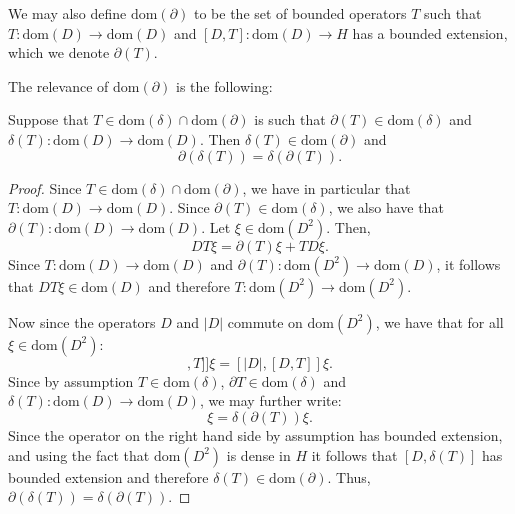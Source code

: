     We may also define $\mathrm{dom}(\partial)$ to be the set of bounded operators $T$ such that $T:\mathrm{dom}(D)\to \mathrm{dom}(D)$
    and $[D,T]:\mathrm{dom}(D)\to H$ has a bounded extension, which we denote $\partial(T)$. 
    
    The relevance of $\mathrm{dom}(\partial)$ is the following:
    \begin{lem}\label{delta and partial commute}
        Suppose that $T \in \mathrm{dom}(\delta)\cap\mathrm{dom}(\partial)$ is such that $\partial(T) \in \mathrm{dom}(\delta)$ and $\delta(T):\mathrm{dom}(D)\to \mathrm{dom}(D)$. Then $\delta(T) \in \mathrm{dom}(\partial)$ and
        \begin{equation*}
            \partial(\delta(T)) = \delta(\partial(T)).
        \end{equation*}
    \end{lem}
    \begin{proof}
        Since $T \in \mathrm{dom}(\delta)\cap\mathrm{dom}(\partial)$, we have in particular that $T:\mathrm{dom}(D)\to\mathrm{dom}(D)$. Since $\partial(T) \in \mathrm{dom}(\delta)$,
        we also have that $\partial(T):\mathrm{dom}(D)\to \mathrm{dom}(D)$. Let $\xi \in \mathrm{dom}(D^2)$. Then,
        \begin{equation*}
            DT\xi = \partial(T)\xi + TD\xi.
        \end{equation*}
        Since $T:\mathrm{dom}(D)\to \mathrm{dom}(D)$ and $\partial(T):\mathrm{dom}(D^2)\to\mathrm{dom}(D)$, it follows that $DT\xi \in \mathrm{dom}(D)$ and therefore $T:\mathrm{dom}(D^2)\to \mathrm{dom}(D^2)$. 
        
        Now since the operators $D$ and $|D|$ commute on $\mathrm{dom}(D^2)$, we have that for all $\xi \in \mathrm{dom}(D^2)$:
        \begin{equation*}
            [D,[|D],T]]\xi = [|D|,[D,T]]\xi.
        \end{equation*}
        Since by assumption $T \in \mathrm{dom}(\delta)$, $\partial T \in \mathrm{dom}(\delta)$ and $\delta(T):\mathrm{dom}(D)\to\mathrm{dom}(D)$, we may further write:
        \begin{equation*}
            [D,\delta(T)]\xi = \delta(\partial(T))\xi.
        \end{equation*}
        Since the operator on the right hand side by assumption has bounded extension, and using the fact that $\mathrm{dom}(D^2)$ is dense { in $H$} it follows that $[D,\delta(T)]$ has bounded extension and therefore
        $\delta(T) \in \mathrm{dom}(\partial)$. Thus, $\partial(\delta(T)) = \delta(\partial(T))$.
    \end{proof}
    
